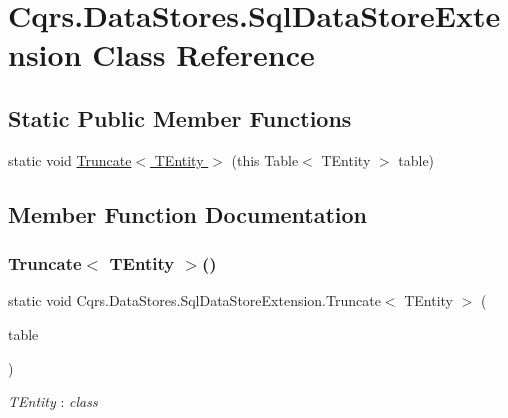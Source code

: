 \hypertarget{classCqrs_1_1DataStores_1_1SqlDataStoreExtension}{}\section{Cqrs.\+Data\+Stores.\+Sql\+Data\+Store\+Extension Class Reference}
\label{classCqrs_1_1DataStores_1_1SqlDataStoreExtension}
\subsection*{Static Public Member Functions}
\begin{DoxyCompactItemize}
\item 
static void \hyperlink{classCqrs_1_1DataStores_1_1SqlDataStoreExtension_a0647739ae3e2ba9b9e488231cc4601ba}{Truncate$<$ T\+Entity $>$} (this Table$<$ T\+Entity $>$ table)
\end{DoxyCompactItemize}


\subsection{Member Function Documentation}
\mbox{\label{classCqrs_1_1DataStores_1_1SqlDataStoreExtension_a0647739ae3e2ba9b9e488231cc4601ba}} 
\subsubsection{\texorpdfstring{Truncate$<$ T\+Entity $>$()}{Truncate< TEntity >()}}
{\footnotesize\ttfamily static void Cqrs.\+Data\+Stores.\+Sql\+Data\+Store\+Extension.\+Truncate$<$ T\+Entity $>$ (\begin{DoxyParamCaption}\item[{this Table$<$ T\+Entity $>$}]{table }\end{DoxyParamCaption})\hspace{0.3cm}{\ttfamily [static]}}

\begin{Desc}
\item[Type Constraints]\begin{description}
\item[{\em T\+Entity} : {\em class}]\end{description}
\end{Desc}
